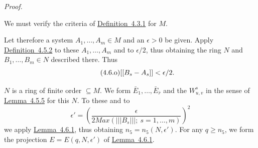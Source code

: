 \documentclass[b5paper,twoside]{article}
\newcommand{\lemref}[2]{\hyperref[#1]{\mbox{Lemma~#2}}}
\newcommand{\defref}[2]{\hyperref[#1]{\mbox{Definition~#2}}}
\theoremstyle{mvnplain}
\renewenvironment{proof}[1][Proof]{%
  \par\addvspace{0.35\baselineskip}%
  \noindent\textit{#1.}\ \normalfont\ignorespaces
}{%
  \par\addvspace{0.35\baselineskip}%
}
\newcommand{\M}{\mathbf M}
\newcommand{\N}{\mathbf N}
\newcommand{\Metric}[1]{\left[\!\left[#1\right]\!\right]}
\newcommand{\OpNorm}[1]{\left\lvert\left\lvert\left\lvert#1\right\rvert\right\rvert\right\rvert}
\def\M{M}%
\def\N{N}%
\def\Metric#1{[[#1]]}%
\def\operatorname#1{#1}%
\begin{document}
\begin{proof}
We must verify the criteria of \defref{def:4.3.1}{4.3.1} for \(\M\).

Let therefore a system \(A_1,\ldots,A_m\in\M\) and an \(\epsilon>0\) be
given. Apply \defref{def:4.5.2}{4.5.2} to these \(A_1,\ldots,A_m\) and to
\(\epsilon/2\), thus obtaining the ring \(\N\) and
\(B_1,\ldots,B_m\in\N\) described there. Thus
\begin{equation}\tag{4.6.\(\mathrm{o}\)}\label{eq:4.6-omicron}
 \Metric{B_s-A_s}<\epsilon/2.
\end{equation}

\(\N\) is a ring of finite order \(\subseteq\M\). We form
\(\bar E_1,\ldots,\bar E_{\bar r}\) and the \(W^s_{u,v}\) in the sense of
\lemref{lem:4.5.5}{4.5.5} for this \(\N\). To these and to
\begin{equation}\tag{4.6.\(\pi\)}\label{eq:4.6-pi}
 \epsilon'=\left(\frac{\epsilon}{2\operatorname{Max}
 (\OpNorm{B_s};\ s=1,\ldots,m)}\right)^2
\end{equation}
we apply \lemref{lem:4.6.1}{4.6.1}, thus obtaining
\(n_5=n_5(\N,\epsilon')\). For any \(q\geq n_5\), we form the projection
\(E=E(q,\N,\epsilon')\) of \lemref{lem:4.6.1}{4.6.1}.


\end{proof}
\end{document}
